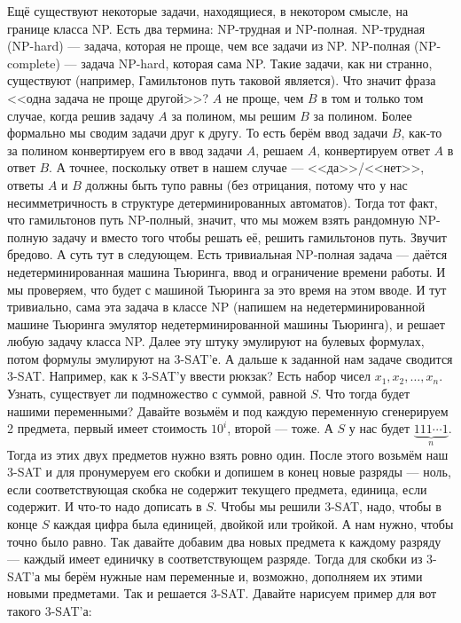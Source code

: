 \documentclass{article}
\begin{document}
    Ещё существуют некоторые задачи, находящиеся, в некотором смысле, на границе класса NP. Есть два термина: NP-трудная и NP-полная. NP-трудная (NP-hard) --- задача, которая не проще, чем все задачи из NP. NP-полная (NP-complete) --- задача NP-hard, которая сама NP. Такие задачи, как ни странно, существуют (например, Гамильтонов путь таковой является). Что значит фраза <<одна задача не проще другой>>? $A$ не проще, чем $B$ в том и только том случае, когда решив задачу $A$ за полином, мы решим $B$ за полином. Более формально мы сводим задачи друг к другу. То есть берём ввод задачи $B$, как-то за полином конвертируем его в ввод задачи $A$, решаем $A$, конвертируем ответ $A$ в ответ $B$. А точнее, поскольку ответ в нашем случае --- <<да>>/<<нет>>, ответы $A$ и $B$ должны быть тупо равны (без отрицания, потому что у нас несимметричность в структуре детерминированных автоматов). Тогда тот факт, что гамильтонов путь NP-полный, значит, что мы можем взять рандомную NP-полную задачу и вместо того чтобы решать её, решить гамильтонов путь. Звучит бредово. А суть тут в следующем. Есть тривиальная NP-полная задача --- даётся недетерминированная машина Тьюринга, ввод и ограничение времени работы. И мы проверяем, что будет с машиной Тьюринга за это время на этом вводе. И тут тривиально, сама эта задача в классе NP (напишем на недетерминированной машине Тьюринга эмулятор недетерминированной машины Тьюринга), и решает любую задачу класса NP. Далее эту штуку эмулируют на булевых формулах, потом формулы эмулируют на 3-SAT'е. А дальше к заданной нам задаче сводится 3-SAT. Например, как к 3-SAT'у ввести рюкзак? Есть набор чисел $x_1,x_2,\ldots,x_n$. Узнать, существует ли подмножество с суммой, равной $S$. Что тогда будет нашими переменными? Давайте возьмём и под каждую переменную сгенерируем 2 предмета, первый имеет стоимость $10^i$, второй --- тоже. А $S$ у нас будет $\underbrace{111\cdots1}_{n}$. Тогда из этих двух предметов нужно взять ровно один. После этого возьмём наш 3-SAT и для пронумеруем его скобки и допишем в конец новые разряды --- ноль, если соответствующая скобка не содержит текущего предмета, единица, если содержит. И что-то надо дописать в $S$. Чтобы мы решили 3-SAT, надо, чтобы в конце $S$ каждая цифра была единицей, двойкой или тройкой. А нам нужно, чтобы точно было равно. Так давайте добавим два новых предмета к каждому разряду --- каждый имеет единичку в соответствующем разряде. Тогда для скобки из 3-SAT'а мы берём нужные нам переменные и, возможно, дополняем их этими новыми предметами. Так и решается 3-SAT. Давайте нарисуем пример для вот такого 3-SAT'а:
\end{document}
